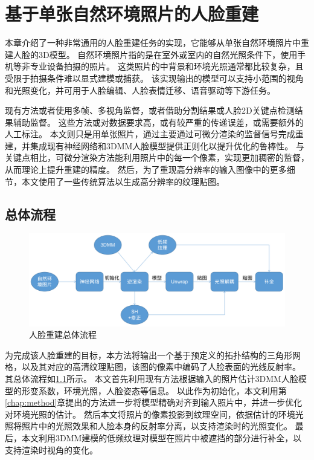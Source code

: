 \chapter{基于单张自然环境照片的人脸重建}
\label{chap:recon}

本章介绍了一种非常通用的人脸重建任务的实现，它能够从单张自然环境照片中重建人脸的3D模型。
自然环境照片指的是在室外或室内的自然光照条件下，使用手机等非专业设备拍摄的照片。
这类照片的中背景和环境光照通常都比较复杂，且受限于拍摄条件难以显式建模或捕获。
该实现输出的模型可以支持小范围的视角和光照变化，并可用于人脸编辑、人脸表情迁移、语音驱动等下游任务。

现有方法或者使用多帧、多视角监督，或者借助分割结果或人脸2D关键点检测结果辅助监督。
这些方法或对数据要求高，或有较严重的传递误差，或需要额外的人工标注。
本文则只是用单张照片，通过主要通过可微分渲染的监督信号完成重建，并集成现有神经网络和3DMM人脸模型提供正则化以提升优化的鲁棒性。
与关键点相比，可微分渲染方法能利用照片中的每一个像素，实现更加稠密的监督，从而理论上提升重建的精度。
然后，为了重现高分辨率的输入图像中的更多细节，本文使用了一些传统算法以生成高分辨率的纹理贴图。

\section{总体流程}

\begin{figure}
    \centering
    \includegraphics[width=0.95\linewidth]{figures/recon_overall}
    \caption{人脸重建总体流程}
    \label{fig:recon_overall}
\end{figure}

为完成该人脸重建的目标，本方法将输出一个基于预定义的拓扑结构的三角形网格，以及其对应的高清纹理贴图，该图的像素中编码了人脸表面的光线反射率。
其总体流程如\ref{fig:recon_overall}所示。
本文首先利用现有方法\citep{deep3d}根据输入的照片估计3DMM人脸模型的形变系数，环境光照，人脸姿态等信息。
以此作为初始化，本文利用第\ref{chap:method}章提出的方法进一步将模型精确对齐到输入照片中，并进一步优化对环境光照的估计。
然后本文将照片的像素投影到纹理空间，依据估计的环境光照将照片中的光照效果和人脸本身的反射率分离，以支持渲染时的光照变化。
最后，本文利用3DMM建模的低频纹理对模型在照片中被遮挡的部分进行补全，以支持渲染时视角的变化。

